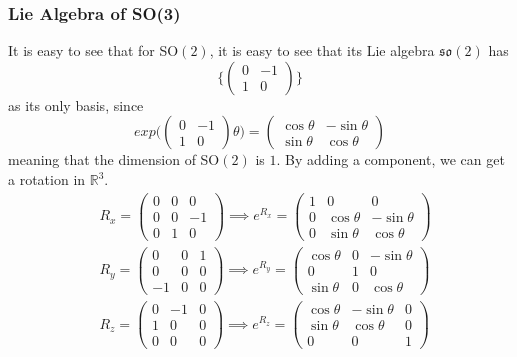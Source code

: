 \documentclass{article}
\begin{document}
    \subsubsection{Lie Algebra of SO(3)}

      It is easy to see that for SO$(2)$, it is easy to see that its Lie algebra $\mathfrak{so}(2)$ has 
      \[\bigg\{ \begin{pmatrix}
      0&-1\\1&0
      \end{pmatrix}\bigg\}\]
      as its only basis, since 
      \[exp  \bigg( \begin{pmatrix}
      0&-1\\1&0
      \end{pmatrix} \theta \bigg) = \begin{pmatrix}
      \cos{\theta} & - \sin{\theta} \\
      \sin{\theta} & \cos{\theta}
      \end{pmatrix}\]
      meaning that the dimension of SO$(2)$ is $1$. By adding a component, we can get a rotation in $\mathbb{R}^3$. 
      \begin{align*}
          & R_x = \begin{pmatrix}0&0&0\\0&0&-1\\0&1&0\end{pmatrix} \implies e^{R_x} = \begin{pmatrix}
          1&0&0\\ 0&\cos{\theta}&-\sin{\theta}\\0&\sin{\theta}&\cos{\theta}
          \end{pmatrix}\\
          & R_y = \begin{pmatrix}0&0&1\\0&0&0\\-1&0&0\end{pmatrix} \implies e^{R_y} = \begin{pmatrix}
          \cos{\theta} & 0 & -\sin{\theta}\\ 0&1&0 \\
          \sin{\theta}& 0 & \cos{\theta} \end{pmatrix} \\
          & R_z = \begin{pmatrix}0&-1&0\\1&0&0\\0&0&0\end{pmatrix} \implies e^{R_z} = \begin{pmatrix}
          \cos{\theta} & -\sin{\theta} & 0\\
          \sin{\theta}& \cos{\theta} & 0 \\ 0 & 0 & 1\end{pmatrix}
      \end{align*}
\end{document}
